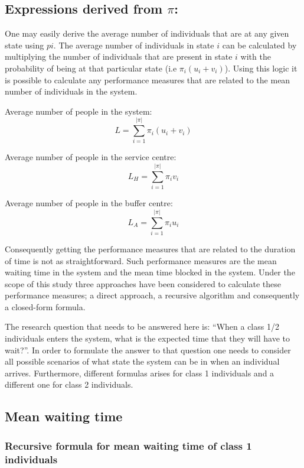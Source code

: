 \subsection{Expressions derived from \( \pi \):}
One may easily derive the average number of individuals that are at any given state 
using \( pi \). 
The average number of individuals in state \( i \) can be calculated by multiplying 
the number of individuals that are present in state \( i \) with the probability 
of being at that particular state (i.e \(\pi_i (u_i + v_i)\)). 
Using this logic it is possible to calculate any performance measures that are related 
to the mean number of individuals in the system.


Average number of people in the system: 
\begin{equation}
    L = \sum_{i=1}^{|\pi|} \pi_i (u_i + v_i)
\end{equation} 

Average number of people in the service centre: 
\begin{equation}
    L_H = \sum_{i=1}^{|\pi|} \pi_i v_i
\end{equation}

Average number of people in the buffer centre:
\begin{equation}
    L_A = \sum_{i=1}^{|\pi|} \pi_i u_i
\end{equation}

Consequently getting the performance measures that are related to the duration of 
time is not as straightforward. 
Such performance measures are the mean waiting time in the system and the mean time 
blocked in the system. 
Under the scope of this study three approaches have been considered to calculate these 
performance measures; a direct approach, a recursive algorithm and consequently a
closed-form formula.

The research question that needs to be answered here is: ``When a class 1/2 
individuals enters the system, what is the expected time that they will have to 
wait?''. 
In order to formulate the answer to that question one needs to consider all possible 
scenarios of what state the system can be in when an individual arrives. 
Furthermore, different formulas arises for class 1 individuals 
and a different one for class 2 individuals.

\subsection{Mean waiting time} 
\subsubsection{Recursive formula for mean waiting time of class 1 individuals}
\label{sec:recursive-waiting-time-others}

